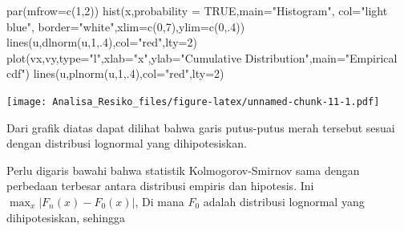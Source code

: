 \documentclass[
]{book}
\newenvironment{Shaded}{\begin{snugshade}}{\end{snugshade}}
\newcommand{\AttributeTok}[1]{\textcolor[rgb]{0.77,0.63,0.00}{#1}}
\newcommand{\ConstantTok}[1]{\textcolor[rgb]{0.00,0.00,0.00}{#1}}
\newcommand{\DecValTok}[1]{\textcolor[rgb]{0.00,0.00,0.81}{#1}}
\newcommand{\FunctionTok}[1]{\textcolor[rgb]{0.00,0.00,0.00}{#1}}
\newcommand{\NormalTok}[1]{#1}
\newcommand{\StringTok}[1]{\textcolor[rgb]{0.31,0.60,0.02}{#1}}
\begin{document}
\begin{Shaded}
\begin{Highlighting}[]
\FunctionTok{par}\NormalTok{(}\AttributeTok{mfrow=}\FunctionTok{c}\NormalTok{(}\DecValTok{1}\NormalTok{,}\DecValTok{2}\NormalTok{))}
\FunctionTok{hist}\NormalTok{(x,}\AttributeTok{probability =} \ConstantTok{TRUE}\NormalTok{,}\AttributeTok{main=}\StringTok{"Histogram"}\NormalTok{, }\AttributeTok{col=}\StringTok{"light blue"}\NormalTok{,}
     \AttributeTok{border=}\StringTok{"white"}\NormalTok{,}\AttributeTok{xlim=}\FunctionTok{c}\NormalTok{(}\DecValTok{0}\NormalTok{,}\DecValTok{7}\NormalTok{),}\AttributeTok{ylim=}\FunctionTok{c}\NormalTok{(}\DecValTok{0}\NormalTok{,.}\DecValTok{4}\NormalTok{))}
\FunctionTok{lines}\NormalTok{(u,}\FunctionTok{dlnorm}\NormalTok{(u,}\DecValTok{1}\NormalTok{,.}\DecValTok{4}\NormalTok{),}\AttributeTok{col=}\StringTok{"red"}\NormalTok{,}\AttributeTok{lty=}\DecValTok{2}\NormalTok{)}
\FunctionTok{plot}\NormalTok{(vx,vy,}\AttributeTok{type=}\StringTok{"l"}\NormalTok{,}\AttributeTok{xlab=}\StringTok{"x"}\NormalTok{,}\AttributeTok{ylab=}\StringTok{"Cumulative Distribution"}\NormalTok{,}\AttributeTok{main=}\StringTok{"Empirical cdf"}\NormalTok{)}
\FunctionTok{lines}\NormalTok{(u,}\FunctionTok{plnorm}\NormalTok{(u,}\DecValTok{1}\NormalTok{,.}\DecValTok{4}\NormalTok{),}\AttributeTok{col=}\StringTok{"red"}\NormalTok{,}\AttributeTok{lty=}\DecValTok{2}\NormalTok{)}
\end{Highlighting}
\end{Shaded}

\texttt{[image: Analisa\_Resiko\_files/figure-latex/unnamed-chunk-11-1.pdf]}

Dari grafik diatas dapat dilihat bahwa garis putus-putus merah tersebut sesuai dengan distribusi lognormal yang dihipotesiskan.

Perlu digaris bawahi bahwa statistik Kolmogorov-Smirnov sama dengan perbedaan terbesar antara distribusi empiris dan hipotesis. Ini \(\max_x |F_n(x)-F_0(x)|\), Di mana \(F_0\) adalah distribusi lognormal yang dihipotesiskan, sehingga
\end{document}
